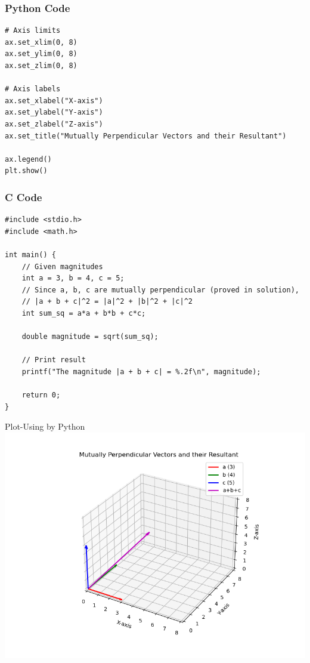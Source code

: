 \documentclass{beamer}
\begin{document}
\begin{frame}[fragile]
    \frametitle{Python Code}
    \begin{lstlisting}
# Axis limits
ax.set_xlim(0, 8)
ax.set_ylim(0, 8)
ax.set_zlim(0, 8)

# Axis labels
ax.set_xlabel("X-axis")
ax.set_ylabel("Y-axis")
ax.set_zlabel("Z-axis")
ax.set_title("Mutually Perpendicular Vectors and their Resultant")

ax.legend()
plt.show()

\end{lstlisting}
\end{frame}

\begin{frame}[fragile]
\frametitle{C Code}
\begin{lstlisting}
#include <stdio.h>
#include <math.h>

int main() {
    // Given magnitudes
    int a = 3, b = 4, c = 5;
    // Since a, b, c are mutually perpendicular (proved in solution),
    // |a + b + c|^2 = |a|^2 + |b|^2 + |c|^2
    int sum_sq = a*a + b*b + c*c;

    double magnitude = sqrt(sum_sq);

    // Print result
    printf("The magnitude |a + b + c| = %.2f\n", magnitude);

    return 0;
}
\end{lstlisting}

\end{frame}


\begin{frame}{Plot-Using by Python}
    \centering
    \includegraphics[width=\columnwidth, height=0.8\textheight, keepaspectratio]{fig4.png}     
\end{frame}
\end{document}

